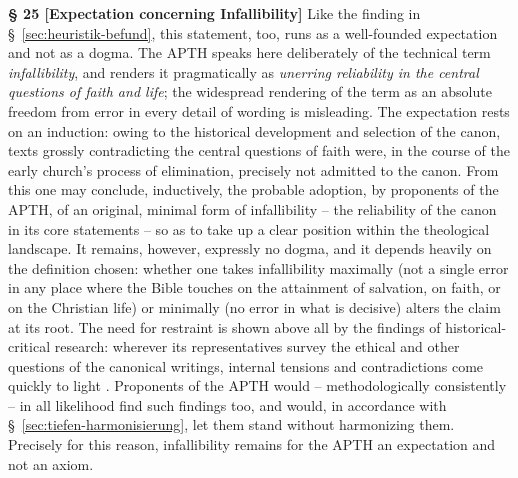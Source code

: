 \documentclass[11pt,a4paper]{article}
\makeatletter
\newcommand{\apth}{{\apthfont APTH}\hspace{0.15em}\xspace}
\newcommand{\apthsec}[3]{%
  \phantomsection%
  \def\@currentlabel{#1}%
  \label{sec:#3}%
  \textbf{§ #1 [#2]}%
}
\makeatother
\begin{document}
\apthsec{25}{Expectation concerning Infallibility}{infallibilitaet} Like the finding in §~\ref{sec:heuristik-befund}, this statement, too, runs as a well-founded expectation and not as a dogma. The \apth speaks here deliberately of the technical term \textit{infallibility}, and renders it pragmatically as \textit{unerring reliability in the central questions of faith and life}; the widespread rendering of the term as an absolute freedom from error in every detail of wording is misleading. The expectation rests on an induction: owing to the historical development and selection of the canon, texts grossly contradicting the central questions of faith were, in the course of the early church's process of elimination, precisely not admitted to the canon. From this one may conclude, inductively, the probable adoption, by proponents of the \apth, of an original, minimal form of infallibility -- the reliability of the canon in its core statements -- so as to take up a clear position within the theological landscape. It remains, however, expressly no dogma, and it depends heavily on the definition chosen: whether one takes infallibility maximally (not a single error in any place where the Bible touches on the attainment of salvation, on faith, or on the Christian life) or minimally (no error in what is decisive) alters the claim at its root. The need for restraint is shown above all by the findings of historical-critical research: wherever its representatives survey the ethical and other questions of the canonical writings, internal tensions and contradictions come quickly to light \citep{dunn1977,kaesemann1951,ehrman2009}. Proponents of the \apth would -- methodologically consistently -- in all likelihood find such findings too, and would, in accordance with §~\ref{sec:tiefen-harmonisierung}, let them stand without harmonizing them. Precisely for this reason, infallibility remains for the \apth an expectation and not an axiom.
\end{document}
